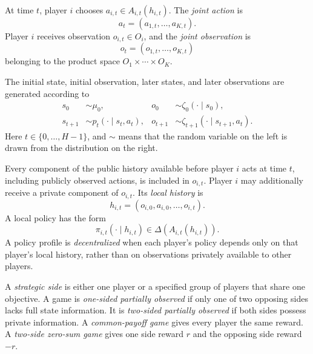 At time $t$, player $i$ chooses $a_{i,t}\in A_{i,t}(h_{i,t})$. The \emph{joint action} is
\begin{equation}
\label{eq:pomg-joint-action}
    a_t=(a_{1,t},\ldots,a_{K,t}).
\end{equation}
Player $i$ receives observation $o_{i,t}\in O_i$, and the \emph{joint observation} is
\begin{equation}
\label{eq:pomg-joint-observation}
    o_t=(o_{1,t},\ldots,o_{K,t})
\end{equation}
belonging to the product space $O_1\times\cdots\times O_K$.

The initial state, initial observation, later states, and later observations are generated according to
\begin{equation}
\label{eq:pomg-generation}
\begin{aligned}
    s_0&\sim\mu_0,
    &o_0&\sim\zeta_0(\cdot\mid s_0),\\
    s_{t+1}&\sim p_t(\cdot\mid s_t,a_t),
    &o_{t+1}&\sim\zeta_{t+1}(\cdot\mid s_{t+1},a_t).
\end{aligned}
\end{equation}
Here $t\in\{0,\ldots,H-1\}$, and $\sim$ means that the random variable on the left is drawn from the distribution on the right.

Every component of the public history available before player $i$ acts at time $t$, including publicly observed actions, is included in $o_{i,t}$. Player $i$ may additionally receive a private component of $o_{i,t}$. Its \emph{local history} is
\begin{equation}
\label{eq:pomg-local-history}
    h_{i,t}
    =
    (o_{i,0},a_{i,0},\ldots,o_{i,t}).
\end{equation}
A local policy has the form
\begin{equation}
\label{eq:pomg-local-policy}
    \pi_{i,t}(\cdot\mid h_{i,t})
    \in
    \Delta(A_{i,t}(h_{i,t})).
\end{equation}
A policy profile is \emph{decentralized} when each player's policy depends only on that player's local history, rather than on observations privately available to other players.

A \emph{strategic side} is either one player or a specified group of players that share one objective. A game is \emph{one-sided partially observed} if only one of two opposing sides lacks full state information. It is \emph{two-sided partially observed} if both sides possess private information. A \emph{common-payoff game} gives every player the same reward. A \emph{two-side zero-sum game} gives one side reward $r$ and the opposing side reward $-r$.

